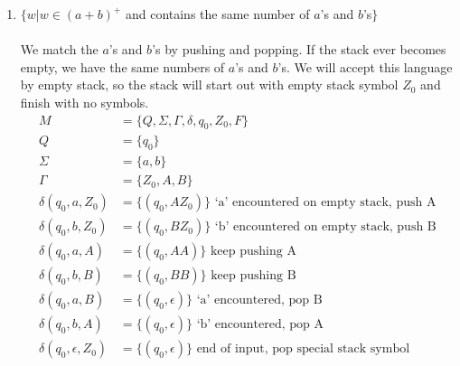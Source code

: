 \documentclass[10pt,a4paper,final]{article}
\begin{document}
\begin{enumerate}
\begin{enumerate}
  \item %
  $\{w|w \in (a+b)^+$ and contains the same number of $a$'s and $b$'s$\}$  \\
  \\
  We match the $a$'s and $b$'s by pushing and popping.
  If the stack ever becomes empty, we have the same numbers of $a$'s and $b$'s.
  We will accept this language by empty stack, so the stack will start out with empty stack
  symbol $Z_0$ and finish with no symbols.
  \\
  \begin{align*}
    M &= \{Q, \Sigma, \Gamma, \delta, q_0, Z_0, F\} \\
    Q &= \{q_0\} \\
    \Sigma &= \{a, b\} \\
    \Gamma &= \{Z_0, A, B\} \\
    \delta(q_0, a, Z_0) &= \{(q_0, AZ_0)\} \mbox{ `a' encountered on empty stack, push A} \\
    \delta(q_0, b, Z_0) &= \{(q_0, BZ_0)\} \mbox{ `b' encountered on empty stack, push B} \\
    \delta(q_0, a, A) &= \{(q_0, AA)\} \mbox{ keep pushing A} \\
    \delta(q_0, b, B) &= \{(q_0, BB)\} \mbox{ keep pushing B} \\
    \delta(q_0, a, B) &= \{(q_0, \epsilon)\} \mbox{ `a' encountered, pop B} \\
    \delta(q_0, b, A) &= \{(q_0, \epsilon)\} \mbox{ `b' encountered, pop A} \\
    \delta(q_0, \epsilon, Z_0) &= \{(q_0, \epsilon)\} \mbox{ end of input, pop special stack symbol}
  \end{align*}
  

\end{enumerate}
\end{enumerate}
\end{document}
